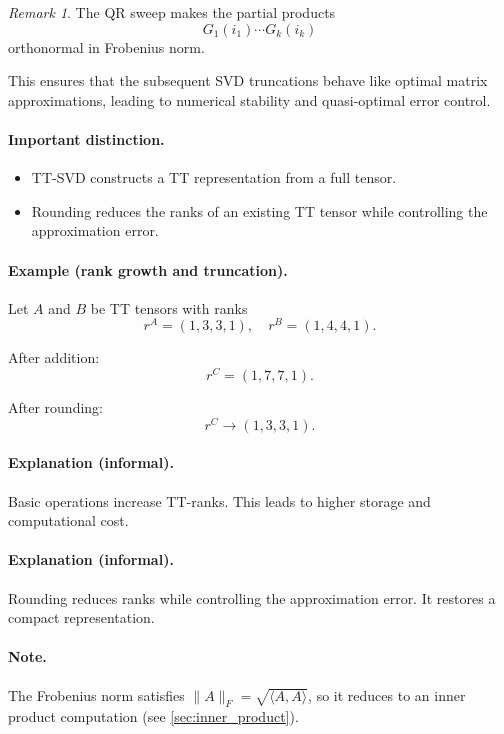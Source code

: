 \documentclass[11pt,a4paper,parskip=half-]{scrartcl}
\theoremstyle{definition}
\theoremstyle{plain}
\theoremstyle{remark}
\newtheorem{remark}{Remark}[section]
\begin{document}
\begin{remark}
  The QR sweep makes the partial products
  \[
    G_1(i_1)\cdots G_k(i_k)
  \]
  orthonormal in Frobenius norm.

  This ensures that the subsequent SVD truncations behave like
  optimal matrix approximations, leading to numerical stability
  and quasi-optimal error control.
\end{remark}

\paragraph{Important distinction.}
\begin{itemize}
  \item TT-SVD constructs a TT representation from a full tensor.
  \item Rounding reduces the ranks of an existing TT tensor
    while controlling the approximation error.
\end{itemize}

\paragraph{Example (rank growth and truncation).}
Let $A$ and $B$ be TT tensors with ranks
\[
r^A = (1,3,3,1), \quad r^B = (1,4,4,1).
\]

After addition:
\[
r^C = (1,7,7,1).
\]

After rounding:
\[
r^C \rightarrow (1,3,3,1).
\]

\paragraph{Explanation (informal).}
Basic operations increase TT-ranks. This leads to higher storage and
computational cost.

\paragraph{Explanation (informal).}
Rounding reduces ranks while controlling the approximation error. It restores
a compact representation.

\paragraph{Note.}
The Frobenius norm satisfies $\|A\|_F = \sqrt{\langle A,A\rangle}$, so it
reduces to an inner product computation (see \cref{sec:inner_product}).
\end{document}
